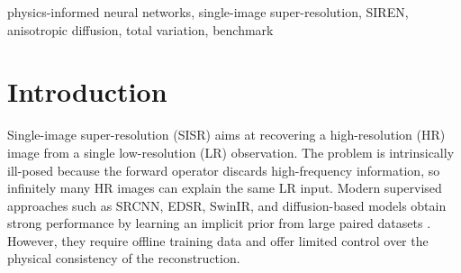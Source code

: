 \documentclass[conference]{IEEEtran}
\begin{document}
\begin{abstract}
Single-image super-resolution can be written as an ill-posed inverse
problem in which many high-resolution images are consistent with the
same low-resolution observation. While supervised super-resolution
networks achieve strong visual quality, they require paired datasets
and encode the image prior implicitly. This work instead focuses on an
interpretable zero-shot setting and documents a benchmark built on
physics-informed neural networks (PINNs). The unknown high-resolution
image is represented by a continuous SIREN and constrained by a known
degradation operator composed of Gaussian blur and subsampling. Within
this unified framework we compare classical PDE-inspired priors,
namely Perona-Malik diffusion and vectorial anisotropic diffusion,
each coupled with either Total Variation or shock regularization. The
benchmark keeps the backbone, optimization schedule, warm start, and
synthetic degradation pipeline fixed so that only the regularization
strategy changes across trials. The final evaluation is designed on
the Set5 Baby and Butterfly images at $\times 2$ and $\times 4$, with
an additional small out-of-distribution check on up to two Darmstadt
images. This draft reports the full methodology, implementation
details, and result templates ready to be completed once the final
runs are available.
\end{abstract}

\begin{IEEEkeywords}
physics-informed neural networks, single-image super-resolution,
SIREN, anisotropic diffusion, total variation, benchmark
\end{IEEEkeywords}

\section{Introduction}
Single-image super-resolution (SISR) aims at recovering a
high-resolution (HR) image from a single low-resolution (LR)
observation. The problem is intrinsically ill-posed because the
forward operator discards high-frequency information, so infinitely
many HR images can explain the same LR input. Modern supervised
approaches such as SRCNN, EDSR, SwinIR, and diffusion-based models
obtain strong performance by learning an implicit prior from large
paired datasets \cite{dong2014srcnn,lim2017edsr,liang2021swinir,saharia2022sr3}.
However, they require offline training data and offer limited control
over the physical consistency of the reconstruction.
\end{document}

